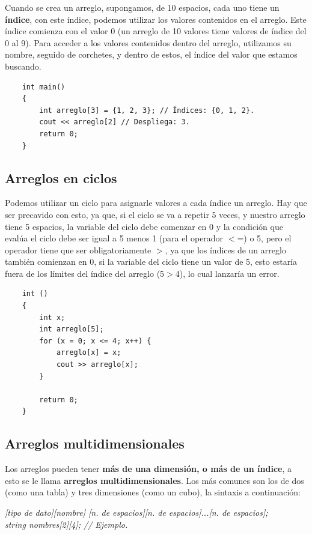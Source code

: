 Cuando se crea un arreglo, supongamos, de 10 espacios, cada uno tiene un \textbf{índice}, con este índice, podemos utilizar los valores contenidos en el arreglo. Este índice comienza con el valor 0 (un arreglo de 10 valores tiene valores de índice del 0 al 9). Para acceder a los valores contenidos dentro del arreglo, utilizamos su nombre, seguido de corchetes, y dentro de estos, el índice del valor que estamos buscando.
\begin{lstlisting}
    int main()
    {
        int arreglo[3] = {1, 2, 3}; // Índices: {0, 1, 2}.
        cout << arreglo[2] // Despliega: 3.
        return 0;
    }
\end{lstlisting}


\subsection{Arreglos en ciclos}
\hspace{0.55cm}Podemos utilizar un ciclo para asignarle valores a cada índice un arreglo. Hay que ser precavido con esto, ya que, si el ciclo se va a repetir 5 veces, y nuestro arreglo tiene 5 espacios, la variable del ciclo debe comenzar en 0 y la condición que evalúa el ciclo debe ser igual a 5 menos 1 (para el operador $<$=) o 5, pero el operador tiene que ser obligatoriamente $>$, ya que los índices de un arreglo también comienzan en 0, si la variable del ciclo tiene un valor de 5, esto estaría fuera de los límites del índice del arreglo (5$>$4), lo cual lanzaría un error.
\begin{lstlisting}
    int ()
    {
        int x;
        int arreglo[5];
        for (x = 0; x <= 4; x++) {
            arreglo[x] = x;
            cout >> arreglo[x];
        }
        
        return 0;
    }
\end{lstlisting}


\subsection{Arreglos multidimensionales}
\hspace{0.55cm}Los arreglos pueden tener \textbf{más de una dimensión, o más de un índice}, a esto se le llama \textbf{arreglos multidimensionales}. Los más comunes son los de dos (como una tabla) y tres dimensiones (como un cubo), la sintaxis a continuación:
\begin{center}
    \textit{
		[tipo de dato][nombre] [n. de espacios][n. de espacios]...[n. de espacios]; \\
		string nombres[2][4]; // Ejemplo.
	}
\end{center}

